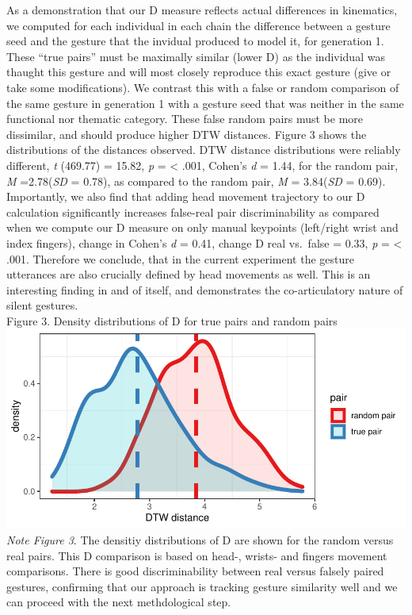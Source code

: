 \documentclass[
  man, noextraspace,floatsintext]{apa6}
\begin{document}
As a demonstration that our D measure reflects actual differences in kinematics, we computed for each individual in each chain the difference between a gesture seed and the gesture that the invidual produced to model it, for generation 1. These ``true pairs'' must be maximally similar (lower D) as the individual was thaught this gesture and will most closely reproduce this exact gesture (give or take some modifications). We contrast this with a false or random comparison of the same gesture in generation 1 with a gesture seed that was neither in the same functional nor thematic category. These false random pairs must be more dissimilar, and should produce higher DTW distances.
Figure 3 shows the distributions of the distances observed. DTW distance distributions were reliably different, \emph{t} (469.77) = 15.82, \emph{p} = \textless{} .001, Cohen's \emph{d} = 1.44, for the random pair, \emph{M} =2.78(\emph{SD} = 0.78), as compared to the random pair, \emph{M} = 3.84(\emph{SD} = 0.69).
Importantly, we also find that adding head movement trajectory to our D calculation significantly increases false-real pair discriminability as compared when we compute our D measure on only manual keypoints (left/right wrist and index fingers), change in Cohen's \emph{d} = 0.41, change D real vs.~false = 0.33, \emph{p} = \textless{} .001. Therefore we conclude, that in the current experiment the gesture utterances are also crucially defined by head movements as well. This is an interesting finding in and of itself, and demonstrates the co-articulatory nature of silent gestures.\\
Figure 3. Density distributions of D for true pairs and random pairs\\
\includegraphics{GNet_WP_files/figure-latex/plot_distributioncheck-1.pdf}
\emph{Note Figure 3}. The densitiy distributions of D are shown for the random versus real pairs. This D comparison is based on head-, wrists- and fingers movement comparisons. There is good discriminability between real versus falsely paired gestures, confirming that our approach is tracking gesture similarity well and we can proceed with the next methdological step.
\end{document}
